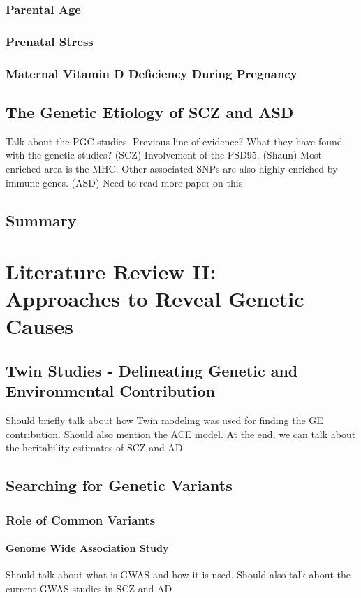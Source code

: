 \documentclass{book}
\begin{document}
			\subsection{Parental Age}
			\subsection{Prenatal Stress}
			\subsection{Maternal Vitamin D Deficiency During Pregnancy}
		\section{The Genetic Etiology of SCZ and ASD}
			Talk about the PGC studies.
			Previous line of evidence?
			What they have found with the genetic studies?
			(SCZ)
			Involvement of the PSD95. (Shaun)
			Most enriched area is the MHC.
			Other associated SNPs are also highly enriched by immune genes.
			(ASD)
			Need to read more paper on this
		\section{Summary}
	
	\chapter[Literature Review II: Approaches to Reveal Genetic Causes]{Literature Review II:\\ Approaches to Reveal Genetic Causes}
		\section{Twin Studies - Delineating Genetic and Environmental Contribution}
			Should briefly talk about how Twin modeling was used for finding the GE contribution.
			Should also mention the ACE model.
			At the end, we can talk about the heritability estimates of SCZ and AD
		\section{Searching for Genetic Variants}
			\subsection{Role of Common Variants}
				\subsubsection{Genome Wide Association Study}
					Should talk about what is GWAS and how it is used.
					Should also talk about the current GWAS studies in SCZ and AD
\end{document}
